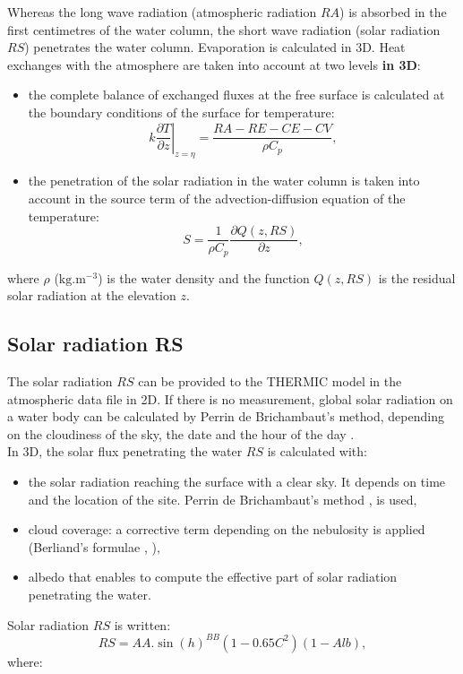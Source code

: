 Whereas the long wave radiation (atmospheric radiation $RA$) is absorbed in
the first centimetres of the water column, the short wave radiation (solar
radiation $RS$) penetrates the water column. Evaporation is calculated in 3D.
Heat exchanges with the atmosphere are taken into account at two levels \textbf{in 3D}:
\begin{itemize}
\item the complete balance of exchanged fluxes at the free surface is
calculated at the boundary conditions of the surface for temperature:
\begin{equation}
k \left.  \dfrac{\partial T}{\partial z}\right|_{z=\eta} =
\dfrac{RA-RE-CE-CV}{\rho C_p},
\end{equation}
\item the penetration of the solar radiation in the water column is taken into
account in the source term of the advection-diffusion equation of the
temperature:
\begin{equation}
S=\dfrac{1}{\rho C_p}\dfrac{\partial Q(z,RS)}{\partial z},
\end{equation}
\end{itemize}
where $\rho$ ($\mathrm{{kg}.{m}^{-3}}$) is the water density and
the function $Q(z, RS)$ is the residual solar radiation at the elevation $z$.

\subsection{Solar radiation RS}

The solar radiation $RS$ can be provided to the THERMIC model
in the atmospheric data file in 2D.
If there is no measurement, global solar radiation on a water body
can be calculated by Perrin de Brichambaut's method,
depending on the cloudiness of the sky, the date and the hour of the day
\cite{klein_ray_solaire_1979}.\\

In 3D, the solar flux penetrating the water $RS$ is calculated with:
\begin{itemize}
\item the solar radiation reaching the surface with a clear sky. It depends on
time and the location of the site. Perrin de Brichambaut's method
\cite{perrin_ray_solaire_1963}, \cite{perrin_res_solaires_1975} is used,
\item cloud coverage: a corrective term depending on the nebulosity is applied
(Berliand's formulae \cite{berliand_cloud_1952}, \cite{berliand_radiatssi_1960}),
\item albedo that enables to compute the effective part of solar radiation
penetrating the water.
\end{itemize}
Solar radiation $RS$ is written:
\begin{equation}
RS = AA.\sin(h)^{BB}(1-0.65C^{2})(1-Alb),
\end{equation}
where:

